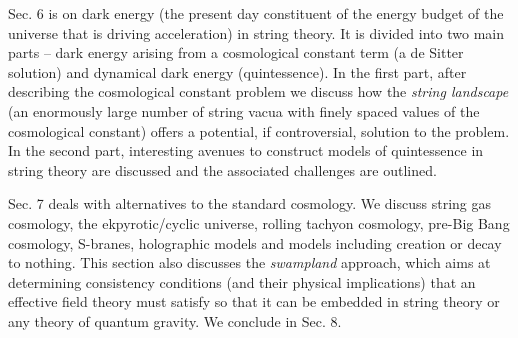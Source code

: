 Sec. 6 is on dark energy (the present day constituent of the energy budget of the universe that is driving acceleration) in string theory. It is divided into two main parts -- dark energy arising from a cosmological constant term (a de Sitter solution) and dynamical dark energy (quintessence). In the
first part, after describing the cosmological constant problem we discuss how the {\it string landscape} (an enormously large number of string vacua with finely spaced values of the cosmological constant) offers a potential, if controversial, solution to the problem. In the second part, interesting avenues to construct models of quintessence in string theory are discussed and the associated challenges are outlined.

Sec. 7 deals with alternatives to the standard cosmology. We discuss string gas cosmology, the ekpyrotic/cyclic universe, rolling tachyon cosmology, pre-Big Bang cosmology, S-branes, holographic models and  models including creation or decay to nothing. This section also discusses  the {\it swampland} approach, which aims at determining consistency conditions (and their physical implications) that an effective field theory must satisfy so that it can be embedded in string theory or any theory of quantum gravity. We conclude in Sec. 8.

 \newpage
 
 
 
 
 
 
 
 
 
 
 
 
 
 